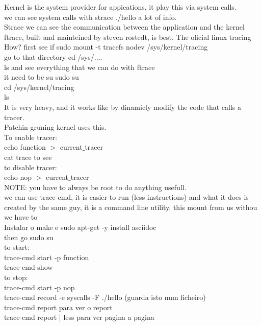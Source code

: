 \documentclass[11pt, a4paper, oneside]{article}
\theoremstyle{definition}
\begin{document}
Kernel is the system provider for appications, it play this via system calls.\\

we can see system calls with strace ./hello a lot of info.\\
Strace we can see the communication between the application and the kernel\\

ftrace, built and mainteined by steven rostedt, is best. The oficial linux tracing\\
How?
first see if sudo mount -t tracefs nodev /sys/kernel/tracing\\
go to that directory cd /sys/....\\
ls and see everything that we can do with ftrace\\
it need to be su 
sudo su\\
cd /sys/kernel/tracing\\
ls\\

It is very heavy, and it works like by dinamicly modify the code that calls a tracer.\\
Patchin gruning kernel uses this.\\

To enable tracer:\\
echo function $>$ current$\_$tracer\\
cat trace to see\\

to disable tracer:\\
echo nop $>$ current$\_$tracer\\

NOTE: you have to always be root to do anything usefull.\\
we can use trace-cmd, it is easier to run (less instructions) and what it does is created by the same guy, it is a command line utility. this mount from us withou we have to\\

Instalar o make e sudo apt-get -y install asciidoc\\
then go sudo su\\
to start:\\
trace-cmd start -p function\\
trace-cmd show\\
to stop:\\
trace-cmd start -p nop\\

trace-cmd record -e syscalls -F ./hello (guarda isto num ficheiro)\\
trace-cmd report para ver o report\\
trace-cmd report | less para ver pagina a pagina\\
\end{document}
